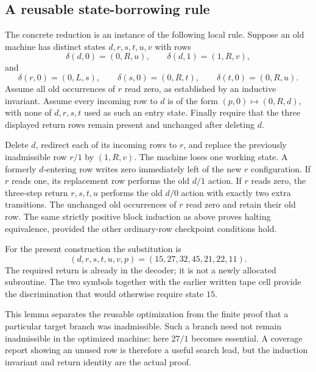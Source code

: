 \subsection{A reusable state-borrowing rule}

The concrete reduction is an instance of the following local rule.  Suppose
an old machine has distinct states $d,r,s,t,u,v$ with rows
\[
\delta(d,0)=(0,R,u),\qquad\delta(d,1)=(1,R,v),
\]
and
\[
\delta(r,0)=(0,L,s),\qquad
\delta(s,0)=(0,R,t),\qquad
\delta(t,0)=(0,R,u).
\]
Assume all old occurrences of $r$ read zero, as established by an inductive
invariant.  Assume every incoming row to $d$ is of the form
$(p,0)\mapsto(0,R,d)$, with none of $d,r,s,t$ used as such an entry state.
Finally require that the three displayed return rows remain present and
unchanged after deleting $d$.

Delete $d$, redirect each of its incoming rows to $r$, and replace the
previously inadmissible row $r/1$ by $(1,R,v)$.  The machine loses one
working state.  A formerly $d$-entering row writes zero immediately left of
the new $r$ configuration.  If $r$ reads one, its replacement row performs
the old $d/1$ action.  If $r$ reads zero, the three-step return
$r,s,t,u$ performs the old $d/0$ action with exactly two extra transitions.
The unchanged old occurrences of $r$ read zero and retain their old row.
The same strictly positive block induction as above proves halting
equivalence, provided the other ordinary-row checkpoint conditions hold.

For the present construction the substitution is
\[
(d,r,s,t,u,v,p)=(15,27,32,45,21,22,11).
\]
The required return is already in the decoder; it is not a newly allocated
subroutine.  The two symbols together with the earlier written tape cell
provide the discrimination that would otherwise require state $15$.

This lemma separates the reusable optimization from the finite proof that
a particular target branch was inadmissible.  Such a branch need not remain
inadmissible in the optimized machine: here $27/1$ becomes essential.  A
coverage report showing an unused row is therefore a useful search lead,
but the induction invariant and return identity are the actual proof.
